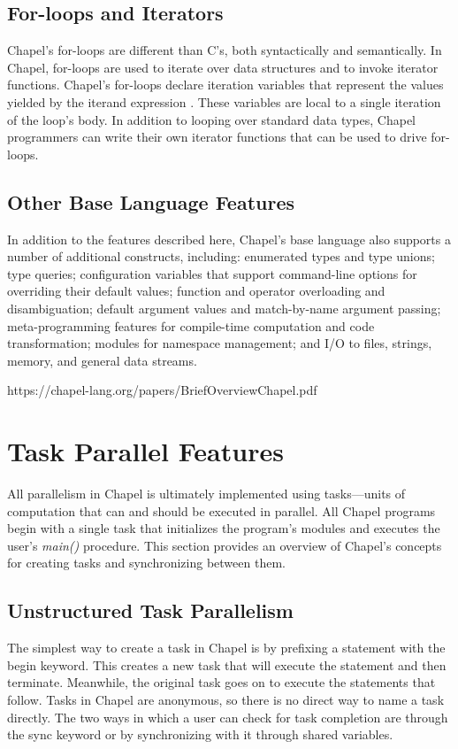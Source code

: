 \documentclass[letterpaper]{article}
\begin{document}
\subsection{For-loops and Iterators}
Chapel’s for-loops are different than C’s, both syntactically and semantically. In Chapel,
for-loops are used to iterate over data structures and to invoke iterator functions. Chapel’s for-loops declare iteration variables that represent the values yielded by the iterand expression . These variables are local to a single iteration of the loop’s body. In addition to looping over standard data types, Chapel programmers can write their own iterator functions that can be used to drive for-loops.

\subsection{Other Base Language Features}
In addition to the features described here, Chapel’s base language also supports a
number of additional constructs, including: enumerated types and type unions; type queries; configuration variables that support command-line options for overriding their default values; function and operator overloading and disambiguation; default argument values and match-by-name argument passing; meta-programming features for compile-time computation and code transformation; modules for namespace management; and I/O to files, strings, memory, and general data streams.

https://chapel-lang.org/papers/BriefOverviewChapel.pdf


\section{ Task Parallel Features}

All parallelism in Chapel is ultimately implemented using tasks—units of computation that can and should be executed in parallel. All Chapel programs begin with a single task that initializes the program’s modules  and  executes  the  user’s
\textit{main()} procedure. This section provides an overview of Chapel’s concepts for creating tasks and synchronizing between them.


 \subsection{ Unstructured Task Parallelism}
The simplest way to create a task in Chapel is by prefixing a statement with the begin keyword. This creates a new task that will execute the statement and then terminate. Meanwhile, the original task goes on to execute the statements that follow. Tasks in Chapel are anonymous, so there is no direct way to name a task directly. The two ways in which a user can check for task completion are through the sync keyword or by synchronizing with it through shared variables.
\end{document}
